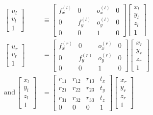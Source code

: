 \begin{align*}
    \begin{bmatrix}
        u_{l} \\
        v_{l} \\
        1
    \end{bmatrix}&\equiv\begin{bmatrix}
        f_{x}^{(l)} & 0 & o_{x}^{(l)} & 0\\
        0 & f_{y}^{(l)} & o_{y}^{(l)} & 0\\
        0 & 0 & 1&0
    \end{bmatrix}\begin{bmatrix}
        x_{l} \\
        y_{l} \\
        z_{l} \\
        1
    \end{bmatrix}\\
    \begin{bmatrix}
        u_{r} \\
        v_{r} \\
        1
    \end{bmatrix}&\equiv\begin{bmatrix}
        f_{x}^{(r)} & 0 & o_{x}^{(r)} & 0\\
        0 & f_{y}^{(r)} & o_{y}^{(r)} & 0\\
        0 & 0 & 1 & 0
    \end{bmatrix}\begin{bmatrix}
        x_{r} \\
        y_{r} \\
        z_{r} \\
        1
    \end{bmatrix}\\
    \text{and}\,
    \begin{bmatrix}
        x_{l} \\
        y_{l} \\
        z_{l} \\
        1
    \end{bmatrix}
    &=\begin{bmatrix}
        r_{11} & r_{12} & r_{13} & t_x\\
        r_{21} & r_{22} & r_{23} & t_y\\
        r_{31} & r_{32} & r_{33} & t_z\\
        0&0&0&1
    \end{bmatrix}
    \begin{bmatrix}
        x_{r} \\
        y_{r} \\
        z_{r} \\
        1
    \end{bmatrix}
\end{align*}
